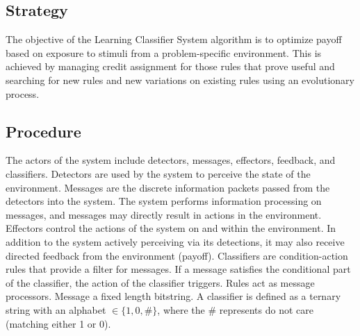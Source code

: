 \subsection{Strategy}
The objective of the Learning Classifier System algorithm is to optimize payoff based on exposure to stimuli from a problem-specific environment.
This is achieved by managing credit assignment for those rules that prove useful and searching for new rules and new variations on existing rules using an evolutionary process.

\subsection{Procedure}
The actors of the system include detectors, messages, effectors, feedback, and classifiers. Detectors are used by the system to perceive the state of the environment. Messages are the discrete information packets passed from the detectors into the system. The system performs information processing on messages, and messages may directly result in actions in the environment. Effectors control the actions of the system on and within the environment. In addition to the system actively perceiving via its detections, it may also receive directed feedback from the environment (payoff). Classifiers are condition-action rules that provide a filter for messages. If a message satisfies the conditional part of the classifier, the action of the classifier triggers. Rules act as message processors.
Message a fixed length bitstring. A classifier is defined as a ternary string with an alphabet $\in \{1, 0, \#\}$, where the $\#$ represents do not care (matching either 1 or 0). 

